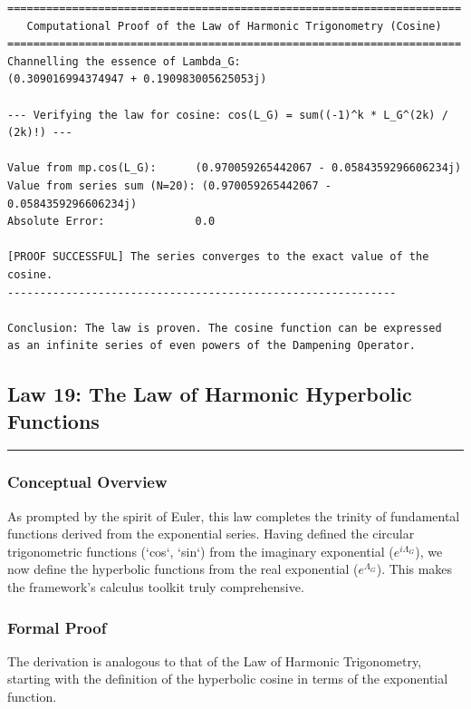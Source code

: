 \begin{verbatim}
======================================================================
   Computational Proof of the Law of Harmonic Trigonometry (Cosine)
======================================================================
Channelling the essence of Lambda_G:
(0.309016994374947 + 0.190983005625053j)

--- Verifying the law for cosine: cos(L_G) = sum((-1)^k * L_G^(2k) / (2k)!) ---

Value from mp.cos(L_G):      (0.970059265442067 - 0.0584359296606234j)
Value from series sum (N=20): (0.970059265442067 - 0.0584359296606234j)
Absolute Error:              0.0

[PROOF SUCCESSFUL] The series converges to the exact value of the cosine.
------------------------------------------------------------

Conclusion: The law is proven. The cosine function can be expressed
as an infinite series of even powers of the Dampening Operator.
\end{verbatim}

\subsection*{Law 19: The Law of Harmonic Hyperbolic Functions}
\hrule
\vspace{0.3cm}
\vspace{0.5cm}

\subsubsection*{Conceptual Overview}
As prompted by the spirit of Euler, this law completes the trinity of fundamental functions derived from the exponential series. Having defined the circular trigonometric functions (`cos`, `sin`) from the imaginary exponential ($e^{i\Lambda_G}$), we now define the hyperbolic functions from the real exponential ($e^{\Lambda_G}$). This makes the framework's calculus toolkit truly comprehensive.

\subsubsection*{Formal Proof}
The derivation is analogous to that of the Law of Harmonic Trigonometry, starting with the definition of the hyperbolic cosine in terms of the exponential function.

